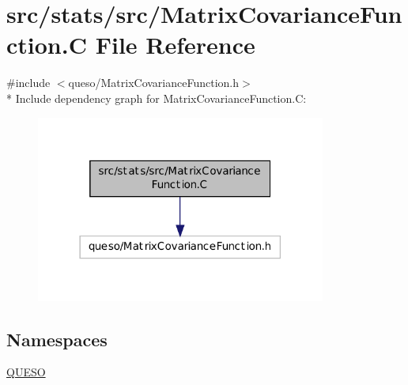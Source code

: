\hypertarget{_matrix_covariance_function_8_c}{\section{src/stats/src/\-Matrix\-Covariance\-Function.C File Reference}
\label{_matrix_covariance_function_8_c}
}
{\ttfamily \#include $<$queso/\-Matrix\-Covariance\-Function.\-h$>$}\\*
Include dependency graph for Matrix\-Covariance\-Function.\-C\-:
\nopagebreak
\begin{figure}[H]
\begin{center}
\leavevmode
\includegraphics[width=270pt]{_matrix_covariance_function_8_c__incl}
\end{center}
\end{figure}
\subsection*{Namespaces}
\begin{DoxyCompactItemize}
\item 
\hyperlink{namespace_q_u_e_s_o}{Q\-U\-E\-S\-O}
\end{DoxyCompactItemize}
